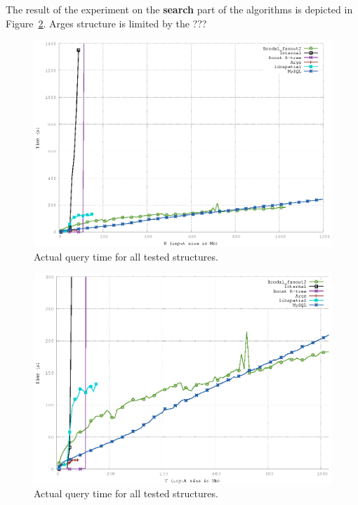 \documentclass[twoside,11pt,openright]{report}
\begin{document}
The result of the experiment on the \textbf{search} part of the algorithms is depicted in Figure~\ref{fig:result_query_search_complexity}. Arges structure is limited by the ???

\begin{figure}[htp!]
\includegraphics[width=\textwidth]{../src/experiments/query_experiment_results/final2/time}
\caption{Actual query time for all tested structures.}
\label{fig:result_query_search_complexity}
\end{figure}

\begin{figure}[htp!]
\includegraphics[width=\textwidth]{../src/experiments/query_experiment_results/final2/time_zoom}
\caption{Actual query time for all tested structures.}
\label{fig:result_query_search_complexity}
\end{figure}
\end{document}
